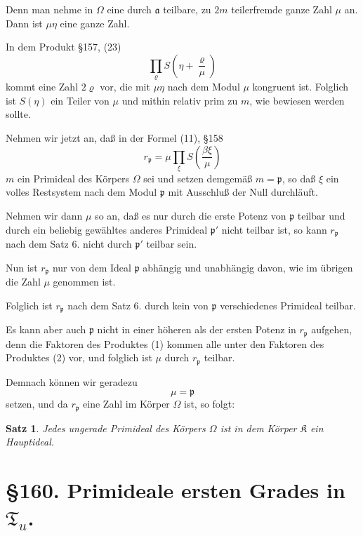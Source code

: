 \documentclass[12pt,a4paper]{article}
\newtheorem*{satz}{Satz}
\begin{document}
Denn man nehme in $\Omega$ eine durch $\mathfrak{a}$ teilbare, zu $2m$ teilerfremde ganze Zahl $\mu$ an. Dann ist $\mu\eta$ eine ganze Zahl.

In dem Produkt \S 157, (23)
\begin{equation}\prod_{\varrho} S\left(\eta + \frac{\varrho}{\mu}\right)\end{equation}
kommt eine Zahl $2\varrho$ vor, die mit $\mu\eta$ nach dem Modul $\mu$ kongruent ist. Folglich ist $S(\eta)$ ein Teiler von $\mu$ und mithin relativ prim zu $m$, wie bewiesen werden sollte.

Nehmen wir jetzt an, da\ss{} in der Formel (11), \S 158
\begin{equation}r_{\mathfrak{p}} = \mu \prod_{\xi} S\left(\frac{\beta\xi}{\mu}\right)\end{equation}
$m$ ein Primideal des K\"orpers $\Omega$ sei und setzen demgem\"a\ss{} $m = \mathfrak{p}$, so da\ss{} $\xi$ ein volles Restsystem nach dem Modul $\mathfrak{p}$ mit Ausschlu\ss{} der Null durchl\"auft.

Nehmen wir dann $\mu$ so an, da\ss{} es nur durch die erste Potenz von $\mathfrak{p}$ teilbar und durch ein beliebig gew\"ahltes anderes Primideal $\mathfrak{p}'$ nicht teilbar ist, so kann $r_{\mathfrak{p}}$ nach dem Satz 6. nicht durch $\mathfrak{p}'$ teilbar sein.

Nun ist $r_{\mathfrak{p}}$ nur von dem Ideal $\mathfrak{p}$ abh\"angig und unabh\"angig davon, wie im \"ubrigen die Zahl $\mu$ genommen ist.

Folglich ist $r_{\mathfrak{p}}$ nach dem Satz 6. durch kein von $\mathfrak{p}$ verschiedenes Primideal teilbar.

Es kann aber auch $\mathfrak{p}$ nicht in einer h\"oheren als der ersten Potenz in $r_{\mathfrak{p}}$ aufgehen, denn die Faktoren des Produktes (1) kommen alle unter den Faktoren des Produktes (2) vor, und folglich ist $\mu$ durch $r_{\mathfrak{p}}$ teilbar.

Demnach k\"onnen wir geradezu
\begin{equation}\mu = \mathfrak{p}\end{equation}
setzen, und da $r_{\mathfrak{p}}$ eine Zahl im K\"orper $\Omega$ ist, so folgt:

\begin{satz}
Jedes ungerade Primideal des K\"orpers $\Omega$ ist in dem K\"orper $\mathfrak{K}$ ein Hauptideal.
\end{satz}

\section*{\S 160. Primideale ersten Grades in $\mathfrak{T}_u$.}
\end{document}
